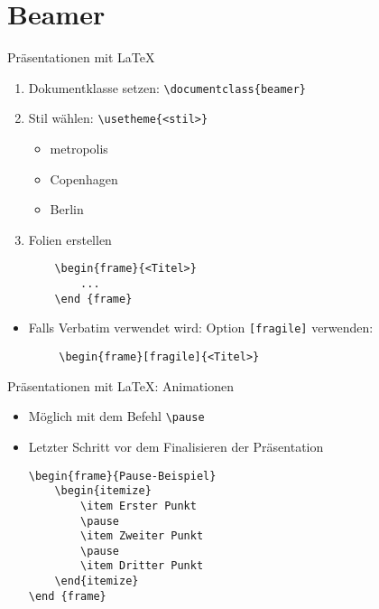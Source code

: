 \documentclass[main.tex]{subfiles}
\begin{document}
\section{Beamer}

\begin{frame}[fragile]{Präsentationen mit \LaTeX}
    \begin{enumerate}
        \item Dokumentklasse setzen: \verb|\documentclass{beamer}|
        \pause
        \medskip
        \item Stil wählen: \verb|\usetheme{<stil>}|
        \begin{itemize}
            \item metropolis
            \item Copenhagen
            \item Berlin
        \end{itemize}
        \pause
        \item Folien erstellen
        \begin{Verbatim}
    \begin{frame}{<Titel>}
        ...
    \end {frame}
        \end{Verbatim}
    \end{enumerate}
    \pause
    \begin{itemize}
        \item Falls Verbatim verwendet wird: Option \verb|[fragile]| verwenden:
    \end{itemize}
    \vspace{-10pt}
    \begin{verbatim}
        \begin{frame}[fragile]{<Titel>}
    \end{verbatim}
\end{frame}

\begin{frame}[fragile]{Präsentationen mit \LaTeX: Animationen}
    \begin{itemize}
        \item Möglich mit dem Befehl \verb|\pause|
        \item Letzter Schritt vor dem Finalisieren der Präsentation
        \pause
        \medskip
        \begin{verbatim}
\begin{frame}{Pause-Beispiel}
    \begin{itemize}
        \item Erster Punkt
        \pause
        \item Zweiter Punkt
        \pause
        \item Dritter Punkt
    \end{itemize}
\end {frame}
        \end{verbatim}
    \end{itemize}
\end{frame}
\end{document}
